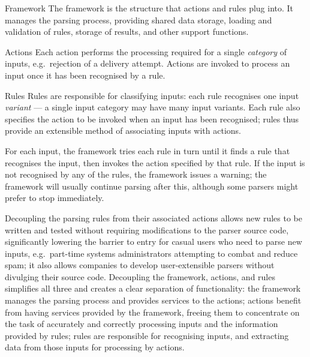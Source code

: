 \begin{boldeqlist}

    \item [Framework]  The framework is the structure that actions and
        rules plug into.  It manages the parsing process, providing shared
        data storage, loading and validation of rules, storage of results,
        and other support functions.

    \item [Actions] Each action performs the processing required for a
        single \textit{category\/} of inputs, e.g.\ rejection of a delivery
        attempt.  Actions are invoked to process an input once it has been
        recognised by a rule.

    \item [Rules]  Rules are responsible for classifying inputs: each rule
        recognises one input \textit{variant\/} --- a single input category
        may have many input variants.  Each rule also specifies the action
        to be invoked when an input has been recognised; rules thus provide
        an extensible method of associating inputs with actions.

\end{boldeqlist}

For each input, the framework tries each rule in turn until it finds a rule
that recognises the input, then invokes the action specified by that rule.
If the input is not recognised by any of the rules, the framework issues a
warning; the framework will usually continue parsing after this, although
some parsers might prefer to stop immediately.

Decoupling the parsing rules from their associated actions allows new rules
to be written and tested without requiring modifications to the parser
source code, significantly lowering the barrier to entry for casual users
who need to parse new inputs, e.g.\ part-time systems administrators
attempting to combat and reduce spam; it also allows companies to develop
user-extensible parsers without divulging their source code.  Decoupling
the framework, actions, and rules simplifies all three and creates a clear
separation of functionality: the framework manages the parsing process and
provides services to the actions; actions benefit from having services
provided by the framework, freeing them to concentrate on the task of
accurately and correctly processing inputs and the information provided by
rules; rules are responsible for recognising inputs, and extracting data
from those inputs for processing by actions.

